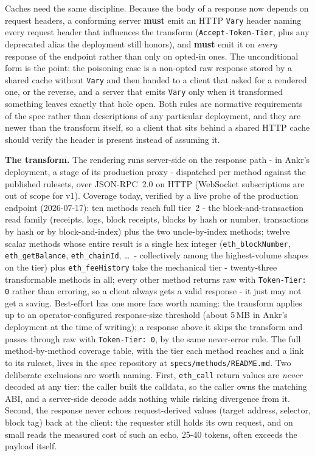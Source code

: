 \documentclass[11pt]{article}
\newcommand{\code}[1]{\texttt{#1}}
\begin{document}
Caches need the same discipline. Because the body of a response now depends on request headers, a conforming server \textbf{must} emit an HTTP \code{Vary} header naming every request header that influences the transform (\code{Accept-Token-Tier}, plus any deprecated alias the deployment still honors), and \textbf{must} emit it on \emph{every} response of the endpoint rather than only on opted-in ones. The unconditional form is the point: the poisoning case is a non-opted raw response stored by a shared cache without \code{Vary} and then handed to a client that asked for a rendered one, or the reverse, and a server that emits \code{Vary} only when it transformed something leaves exactly that hole open. Both rules are normative requirements of the spec rather than descriptions of any particular deployment, and they are newer than the transform itself, so a client that sits behind a shared HTTP cache should verify the header is present instead of assuming it.

\textbf{The transform.} The rendering runs server-side on the response path - in Ankr's deployment, a stage of its production proxy - dispatched per method against the published rulesets, over JSON-RPC~2.0 on HTTP (WebSocket subscriptions are out of scope for v1). Coverage today, verified by a live probe of the production endpoint (2026-07-17): ten methods reach full tier~2 - the block-and-transaction read family (receipts, logs, block receipts, blocks by hash or number, transactions by hash or by block-and-index) plus the two uncle-by-index methods; twelve scalar methods whose entire result is a single hex integer (\code{eth\_blockNumber}, \code{eth\_getBalance}, \code{eth\_chainId}, \ldots\ - collectively among the highest-volume shapes on the tier) plus \code{eth\_feeHistory} take the mechanical tier - twenty-three transformable methods in all; every other method returns raw with \code{Token-Tier: 0} rather than erroring, so a client always gets a valid response - it just may not get a saving. Best-effort has one more face worth naming: the transform applies up to an operator-configured response-size threshold (about 5\,MB in Ankr's deployment at the time of writing); a response above it skips the transform and passes through raw with \code{Token-Tier: 0}, by the same never-error rule. The full method-by-method coverage table, with the tier each method reaches and a link to its ruleset, lives in the spec repository at \code{specs/methods/README.md}. Two deliberate exclusions are worth naming. First, \code{eth\_call} return values are \emph{never} decoded at any tier: the caller built the calldata, so the caller owns the matching ABI, and a server-side decode adds nothing while risking divergence from it. Second, the response never echoes request-derived values (target address, selector, block tag) back at the client: the requester still holds its own request, and on small reads the measured cost of such an echo, 25-40 tokens, often exceeds the payload itself.
\end{document}
